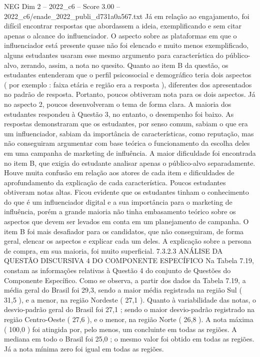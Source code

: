 \begin{textsample}{NEG Dim 2 – 2022\_c6 – Score 3.00 – 2022\_c6/enade\_2022\_publi\_d731a0a567.txt}
Já em relação ao engajamento, foi difícil encontrar respostas que abordassem a ideia, exemplificando e sem citar apenas o alcance do influenciador.
O aspecto sobre as plataformas em que o influenciador está presente quase não foi elencado e muito menos exemplificado, alguns estudantes usaram esse mesmo argumento para característica do público-alvo, zerando, assim, a nota no quesito.
Quanto ao item B da questão, os estudantes entenderam que o perfil psicossocial e demográfico teria dois aspectos ( por exemplo : faixa etária e região era a resposta ), diferentes dos apresentados no padrão de resposta.
Portanto, poucos obtiveram nota para os dois aspectos.
Já no aspecto 2, poucos desenvolveram o tema de forma clara.
A maioria dos estudantes respondeu à Questão 3, no entanto, o desempenho foi baixo.
As respostas demonstraram que os estudantes, por senso comum, sabiam o que era um influenciador, sabiam da importância de características, como reputação, mas não conseguiram argumentar com base teórica o funcionamento da escolha deles em uma campanha de marketing de influência.
A maior dificuldade foi encontrada no item B, que exigia do estudante analisar apenas o público-alvo separadamente.
Houve muita confusão em relação aos atores de cada item e dificuldades de aprofundamento da explicação de cada característica.
Poucos estudantes obtiveram notas altas.
Ficou evidente que os estudantes tinham o conhecimento do que é um influenciador digital e a sua importância para o marketing de influência, porém a grande maioria não tinha embasamento teórico sobre os aspectos que devem ser levados em conta em um planejamento de campanha.
O item B foi mais desafiador para os candidatos, que não conseguiram, de forma geral, elencar os aspectos e explicar cada um deles.
A explicação sobre a persona de compra, em sua maioria, foi muito superficial. 7.3.2.3 ANÁLISE DA QUESTÃO DISCURSIVA 4 DO COMPONENTE ESPECÍFICO Na Tabela 7.19, constam as informações relativas à Questão 4 do conjunto de Questões do Componente Específico.
Como se observa, a partir dos dados da Tabela 7.19, a média geral do Brasil foi 29,3, sendo a maior média registrada na região Sul ( 31,5 ), e a menor, na região Nordeste ( 27,1 ).
Quanto à variabilidade das notas, o desvio-padrão geral do Brasil foi 27,1 ; sendo o maior desvio-padrão registrado na região Centro-Oeste ( 27,6 ), e o menor, na região Norte ( 26,8 ).
A nota máxima ( 100,0 ) foi atingida por, pelo menos, um concluinte em todas as regiões.
A mediana em todo o Brasil foi 25,0 ; o mesmo valor foi obtido em todas as regiões.
Já a nota mínima zero foi igual em todas as regiões.

\end{textsample}
